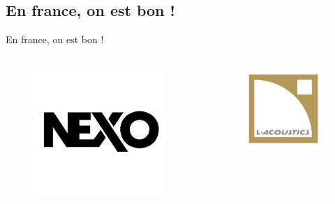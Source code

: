\documentclass[aspectratio=169]{beamer}
\begin{document}
\subsection{En france, on est bon !}
\begin{frame}{En france, on est bon !}
\begin{columns}[t]\small
  \begin{column}{.33\textwidth}
  	\begin{figure}[!h]
	\includegraphics[width=1\textwidth]{figure/nexo.jpg}
	\end{figure}
  \end{column}
  \begin{column}{.33\textwidth}
  	\begin{figure}[!h]
	\includegraphics[width=1\textwidth]{figure/lacoustics.png}

\end{figure}
\end{column}
\end{columns}
\end{frame}
\end{document}
